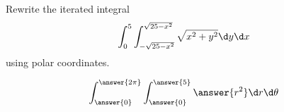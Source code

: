 \documentclass{ximera}
\author{Gregory Hartman \and Bart Snapp}
\begin{document}
\begin{exercise}
  Rewrite the iterated integral
  \[
  \int_0^5 \int_{-\sqrt{25-x^2}}^{\sqrt{25-x^2}}\sqrt{x^2+y^2} \d y \d x
  \]
  using polar coordinates.
  \begin{prompt}
    \[
    \int_{\answer{0}}^{\answer{2\pi}}\int_{\answer{0}}^{\answer{5}} \answer{r^2} \d r \d \theta
    \]
  \end{prompt}
\end{exercise}
\end{document}
